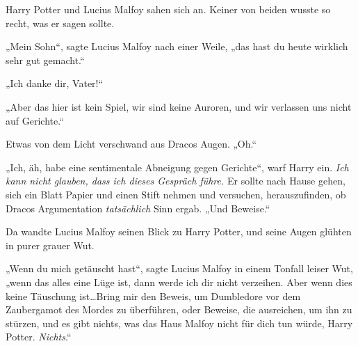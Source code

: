 
Harry Potter und Lucius Malfoy sahen sich an. Keiner von beiden wusste so recht, was er sagen sollte.

„Mein Sohn“, sagte Lucius Malfoy nach einer Weile, „das hast du heute wirklich sehr gut gemacht.“

„Ich danke dir, Vater!“

„Aber das hier ist kein Spiel, wir sind keine Auroren, und wir verlassen uns nicht auf Gerichte.“

Etwas von dem Licht verschwand aus Dracos Augen. „Oh.“

„Ich, äh, habe eine sentimentale Abneigung gegen Gerichte“, warf Harry ein.
\emph{Ich kann nicht glauben, dass ich dieses Gespräch führe.} Er sollte nach Hause gehen, sich ein Blatt Papier und einen Stift nehmen und versuchen, herauszufinden, ob Dracos Argumentation \emph{tatsächlich} Sinn ergab. „Und Beweise.“

Da wandte Lucius Malfoy seinen Blick zu Harry Potter, und seine Augen glühten in purer grauer Wut.

„Wenn du mich getäuscht hast“, sagte Lucius Malfoy in einem Tonfall leiser Wut, „wenn das alles eine Lüge ist, dann werde ich dir nicht verzeihen. Aber wenn dies keine Täuschung ist…Bring mir den Beweis, um Dumbledore vor dem Zaubergamot des Mordes zu überführen, oder Beweise, die ausreichen, um ihn zu stürzen, und es gibt nichts, was das Haus Malfoy nicht für dich tun würde, Harry Potter. \emph{Nichts}.“


